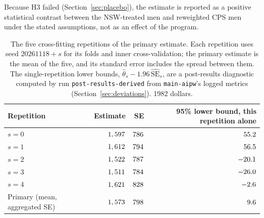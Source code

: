 \documentclass[11pt]{article}
\newcommand{\run}[1]{\texttt{#1}}
\begin{document}
Because H3 failed (Section~\ref{sec:placebo}), the estimate is reported as a positive
statistical contrast between the NSW-treated men and reweighted CPS men under the stated
assumptions, not as an effect of the program.

\begin{table}[tbp]
\centering
\caption{The five cross-fitting repetitions of the primary estimate. Each repetition uses
seed $20261118 + s$ for its folds and inner cross-validation; the primary estimate is the
mean of the five, and its standard error includes the spread between them. The single-repetition
lower bounds, $\hat\theta_s - 1.96\,\widehat{\mathrm{SE}}_s$, are a post-results diagnostic
computed by run \run{post-results-derived} from \run{main-aipw}'s logged metrics
(Section~\ref{sec:deviations}). 1982 dollars.}
\label{tab:reps}
\small
\begin{tabular}{@{}l r r r@{}}
\toprule
Repetition & Estimate & SE & 95\% lower bound, this repetition alone \\
\midrule
$s = 0$ & $1,597$ & $786$ & $55.2$ \\
$s = 1$ & $1,612$ & $794$ & $56.5$ \\
$s = 2$ & $1,522$ & $787$ & $-20.1$ \\
$s = 3$ & $1,511$ & $784$ & $-26.0$ \\
$s = 4$ & $1,621$ & $828$ & $-2.6$ \\
\midrule
Primary (mean, aggregated SE) & $1,573$ & $798$ & $9.6$ \\
\bottomrule
\end{tabular}
\end{table}
\end{document}
